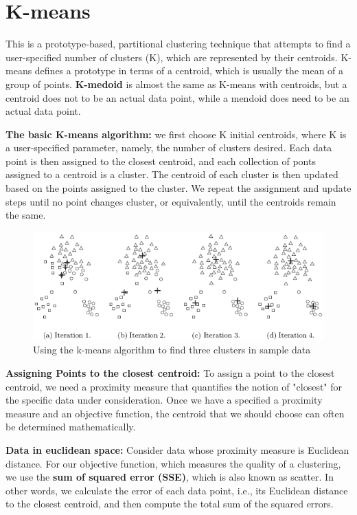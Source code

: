 	\clearpage
	\section{K-means}
		This is a prototype-based, partitional clustering technique that attempts to find a
		user-specified number of clusters (K), which are represented by their centroids. 
		K-means defines a prototype in terms of a centroid, which is usually the mean of a 
		group of points. {\bf K-medoid} is almost the same as K-means with centroids, but a centroid
		does not to be an actual data point, while a mendoid does need to be an actual data point.

		{\bf The basic K-means algorithm:} we first choose K initial centroids, where K is a 
		user-specified parameter, namely, the number of clusters desired. Each data point is then
		assigned to the closest centroid, and each collection of ponts assigned to a centroid is a
		cluster. The centroid of each cluster is then updated based on the points assigned to the
		cluster. We repeat the assignment and update steps until no point changes cluster, or 
		equivalently, until the centroids remain the same.

		\begin{figure}[H]
			\centering
			\includegraphics[width=\textwidth]{pics/iterations.png}
			\caption{Using the k-means algorithm to find three clusters in sample data}

		\end{figure} 

		{\bf Assigning Points to the closest centroid:}	To assign a point to the closest centroid, 
		we need a proximity measure that quantifies the notion of "closest" for the specific data
		under consideration. Once we have a specified a proximity measure and an objective function, 
		the centroid that we should choose can often be determined mathematically. 

		{\bf Data in euclidean space:} Consider data whose proximity measure is Euclidean distance.
		For our objective function, which measures the quality of a clustering, we use the 
		{\bf sum of squared error (SSE)}, which is also known as scatter. In other words, we 
		calculate the error of each data point, i.e., its Euclidean distance to the closest centroid,
		and then compute the total sum of the squared errors. 

